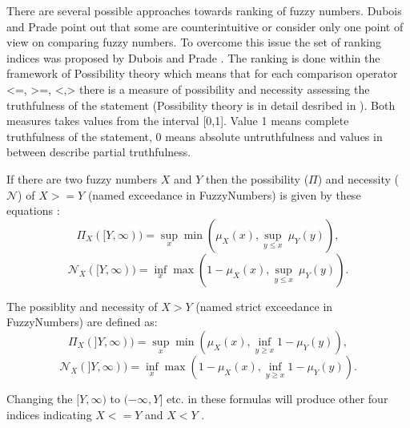 \documentclass[11pt]{article}\usepackage[]{graphicx}\usepackage[]{color}
\newcommand{\package}[1]{\textsf{#1}\xspace}
\begin{document}
There are several possible approaches towards ranking of fuzzy numbers. Dubois and Prade \cite{DuboisPrade1983:rankfn} point out that some are counterintuitive or consider only one point of view on comparing fuzzy numbers. To overcome this issue the set of ranking indices was proposed by Dubois and Prade \cite{DuboisPrade1983:rankfn}. The ranking is done within the framework of Possibility theory which means that for each comparison operator <=, >=, <,> there is a measure of possibility and necessity assessing the truthfulness of the statement (Possibility theory is in detail desribed in \cite{DuboisPrade1986:possbook}). Both measures takes values from the interval [0,1]. Value 1 means complete truthfulness of the statement, 0 means absolute untruthfulness and values in between describe partial truthfulness.

If there are two fuzzy numbers $X$ and $Y$ then the possibility ($\Pi$) and necessity ($\mathcal{N}$) of $X>=Y$ (named exceedance in \package{FuzzyNumbers}) is given by these equations \cite{DuboisPrade1983:rankfn}: 
\begin{equation}
\Pi_{X}( [ Y,\infty )) = \underset{x}{\sup} \min ( \mu_{X}(x), \underset{y \leq x}{\sup} \ \mu_{Y} (y) ),
\end{equation} 
\begin{equation}
\mathcal{N}_{X}( [ Y,\infty )) = \underset{x}{\inf} \max ( 1 - \mu_{X}(x), \underset{y \leq x}{\sup} \ \mu_{Y} (y) ).
\end{equation} 

The possiblity and necessity of $X>Y$ (named strict exceedance in \package{FuzzyNumbers}) are defined as\cite{DuboisPrade1983:rankfn}:
\begin{equation}
\Pi_{X}( ] Y,\infty )) = \underset{x}{\sup} \min ( \mu_{X}(x), \underset{y \geq x}{\inf} 1 - \mu_{Y} (y) ),
\end{equation} 
\begin{equation}
\mathcal{N}_{X}( ] Y,\infty )) = \underset{x}{\inf} \max ( 1-\mu_{X}(x), \underset{y \geq x}{\inf} 1 - \mu_{Y} (y) ).
\end{equation} 

Changing the $[ Y,\infty )$ to $( - \infty, Y ]$ etc. in these formulas will produce other four indices indicating $X<=Y$ and $X<Y$ \cite{DuboisPrade1983:rankfn,DuboisPrade1986:possbook}.
\end{document}
